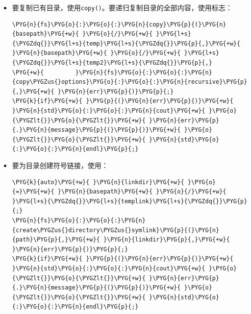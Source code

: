 \begin{itemize}

\item 要复制已有目录，使用\texttt{copy()}。要递归复制目录的全部内容，使用标志：



\begin{codeblockbg}
\begin{Verbatim}[commandchars=\\\{\},breaklines=true,breakanywhere=true,fontsize=\codefont,xleftmargin=17bp]
\PYG{n}{fs}\PYG{o}{:}\PYG{o}{:}\PYG{n}{copy}\PYG{p}{(}\PYG{n}{basepath}\PYG{+w}{ }\PYG{o}{/}\PYG{+w}{ }\PYG{l+s}{\PYGZdq{}}\PYG{l+s}{temp}\PYG{l+s}{\PYGZdq{}}\PYG{p}{,}\PYG{+w}{ }\PYG{n}{basepath}\PYG{+w}{ }\PYG{o}{/}\PYG{+w}{ }\PYG{l+s}{\PYGZdq{}}\PYG{l+s}{temp2}\PYG{l+s}{\PYGZdq{}}\PYG{p}{,}
\PYG{+w}{         }\PYG{n}{fs}\PYG{o}{:}\PYG{o}{:}\PYG{n}{copy\PYGZus{}options}\PYG{o}{:}\PYG{o}{:}\PYG{n}{recursive}\PYG{p}{,}\PYG{+w}{ }\PYG{n}{err}\PYG{p}{)}\PYG{p}{;}
\PYG{k}{if}\PYG{+w}{ }\PYG{p}{(}\PYG{n}{err}\PYG{p}{)}\PYG{+w}{ }\PYG{n}{std}\PYG{o}{:}\PYG{o}{:}\PYG{n}{cout}\PYG{+w}{ }\PYG{o}{\PYGZlt{}}\PYG{o}{\PYGZlt{}}\PYG{+w}{ }\PYG{n}{err}\PYG{p}{.}\PYG{n}{message}\PYG{p}{(}\PYG{p}{)}\PYG{+w}{ }\PYG{o}{\PYGZlt{}}\PYG{o}{\PYGZlt{}}\PYG{+w}{ }\PYG{n}{std}\PYG{o}{:}\PYG{o}{:}\PYG{n}{endl}\PYG{p}{;}
\end{Verbatim}
\end{codeblockbg}



\item 要为目录创建符号链接，使用：



\begin{codeblockbg}
\begin{Verbatim}[commandchars=\\\{\},breaklines=true,breakanywhere=true,fontsize=\codefont,xleftmargin=17bp]
\PYG{k}{auto}\PYG{+w}{ }\PYG{n}{linkdir}\PYG{+w}{ }\PYG{o}{=}\PYG{+w}{ }\PYG{n}{basepath}\PYG{+w}{ }\PYG{o}{/}\PYG{+w}{ }\PYG{l+s}{\PYGZdq{}}\PYG{l+s}{templink}\PYG{l+s}{\PYGZdq{}}\PYG{p}{;}
\PYG{n}{fs}\PYG{o}{:}\PYG{o}{:}\PYG{n}{create\PYGZus{}directory\PYGZus{}symlink}\PYG{p}{(}\PYG{n}{path}\PYG{p}{,}\PYG{+w}{ }\PYG{n}{linkdir}\PYG{p}{,}\PYG{+w}{ }\PYG{n}{err}\PYG{p}{)}\PYG{p}{;}
\PYG{k}{if}\PYG{+w}{ }\PYG{p}{(}\PYG{n}{err}\PYG{p}{)}\PYG{+w}{ }\PYG{n}{std}\PYG{o}{:}\PYG{o}{:}\PYG{n}{cout}\PYG{+w}{ }\PYG{o}{\PYGZlt{}}\PYG{o}{\PYGZlt{}}\PYG{+w}{ }\PYG{n}{err}\PYG{p}{.}\PYG{n}{message}\PYG{p}{(}\PYG{p}{)}\PYG{+w}{ }\PYG{o}{\PYGZlt{}}\PYG{o}{\PYGZlt{}}\PYG{+w}{ }\PYG{n}{std}\PYG{o}{:}\PYG{o}{:}\PYG{n}{endl}\PYG{p}{;}
\end{Verbatim}
\end{codeblockbg}



\end{itemize}
